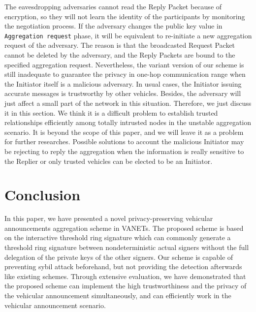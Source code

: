 \documentclass[a4paper]{article}
\begin{document}
The eavesdropping adversaries cannot read the Reply Packet because of encryption, so they will not learn the identity of the participants by monitoring the negotiation process. If the adversary changes the public key value  in \texttt{Aggregation request} phase, it will be equivalent to re-initiate a new aggregation request of the adversary. The reason is that the broadcasted Request Packet cannot be deleted by the adversary, and the Reply Packets are bound to the specified aggregation request. Nevertheless, the variant version of our scheme is still inadequate to guarantee the privacy in one-hop communication range when the Initiator itself is a malicious adversary. In usual cases, the Initiator issuing accurate messages is trustworthy by other vehicles. Besides, the adversary will just affect a small part of the network in this situation. Therefore, we just discuss it in this section. We think it is a difficult problem to establish trusted relationships efficiently among totally intrusted nodes in the unstable aggregation scenario. It is beyond the scope of this paper, and we will leave it as a problem for further researches. Possible solutions to account the malicious Initiator may be rejecting to reply the aggregation when the information is really sensitive to the Replier or only trusted vehicles can be elected to be an Initiator.

\section{Conclusion}
In this paper, we have presented a novel privacy-preserving vehicular announcements aggregation scheme in VANETs. The proposed scheme is based on the interactive threshold ring signature which can commonly generate a threshold ring signature between nondeterministic actual signers without the full delegation of the private keys of the other signers. Our scheme is capable of preventing sybil attack beforehand, but not providing the detection afterwards like existing schemes. Through extensive evaluation, we have demonstrated that the proposed scheme can implement the high trustworthiness and the privacy of the vehicular announcement simultaneously, and can efficiently work in the vehicular announcement scenario.
\end{document}
